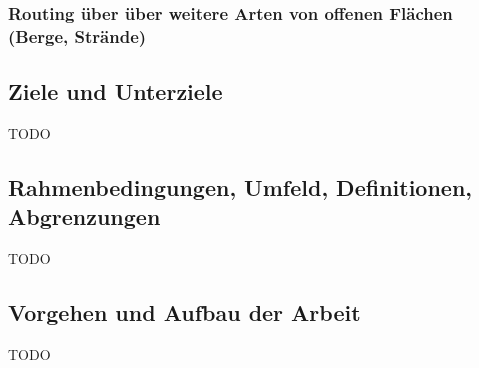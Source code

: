 \subsubsection{Routing über über weitere Arten von offenen Flächen (Berge, Strände)}
\label{subsub: Routing über über weitere Arten von offenen Flächen (Berge, Strände)}
	
\subsection{Ziele und Unterziele}
\label{sub:Ziele und Unterziele}
TODO

\subsection{Rahmenbedingungen, Umfeld, Definitionen, Abgrenzungen}
\label{sub:Rahmenbedingungen, Umfeld, Definitionen, Abgrenzungen}
TODO

\subsection{Vorgehen und Aufbau der Arbeit}
\label{sub:Vorgehen und Aufbau der Arbeit}
TODO
